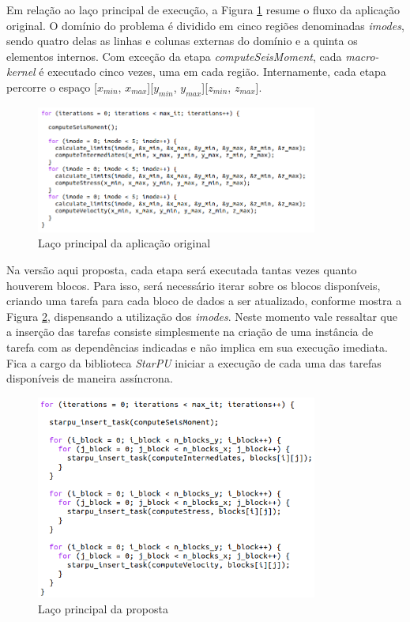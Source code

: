 \documentclass[cic,tc]{iiufrgs}
\begin{document}
Em relação ao laço principal de execução, a Figura \ref{fig:main_loop} resume o fluxo da aplicação original. O domínio do problema é dividido em cinco regiões denominadas \textit{imodes},
sendo quatro delas as linhas e colunas externas do domínio e a quinta os elementos internos. Com exceção da etapa \textit{computeSeisMoment}, cada \textit{macro-kernel} é executado cinco
vezes, uma em cada região. Internamente, cada etapa percorre o espaço [$x_{min}$, $x_{max}$][$y_{min}$, $y_{max}$][$z_{min}$, $z_{max}$].

\begin{figure}[!htb]
    \caption{Laço principal da aplicação original}
    \begin{center}
      \includegraphics[width=25em]{main_loop}
    \end{center}
    \label{fig:main_loop}
\end{figure}

Na versão aqui proposta, cada etapa será executada tantas vezes quanto houverem blocos. Para isso, será necessário iterar sobre os blocos disponíveis, criando uma tarefa para cada bloco de dados a ser atualizado, conforme mostra a Figura \ref{fig:new_main_loop}, dispensando a utilização dos \textit{imodes}. Neste momento vale ressaltar que a inserção das tarefas consiste
simplesmente na criação de uma instância de tarefa com as dependências indicadas e não implica em sua execução imediata. Fica a cargo da biblioteca \textit{StarPU} iniciar a execução
de cada uma das tarefas disponíveis de maneira assíncrona.

\begin{figure}[!htb]
    \caption{Laço principal da proposta}
    \begin{center}
      \includegraphics[width=25em]{new_main_loop}
    \end{center}
    \label{fig:new_main_loop}
\end{figure}
\end{document}
